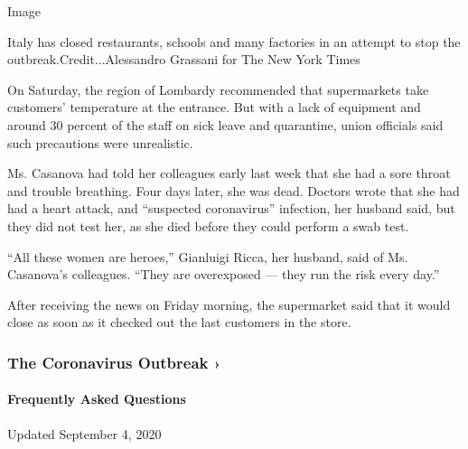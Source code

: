 Image

Italy has closed restaurants, schools and many factories in an attempt
to stop the outbreak.Credit...Alessandro Grassani for The New York Times

On Saturday, the region of Lombardy recommended that supermarkets take
customers' temperature at the entrance. But with a lack of equipment and
around 30 percent of the staff on sick leave and quarantine, union
officials said such precautions were unrealistic.

Ms. Casanova had told her colleagues early last week that she had a sore
throat and trouble breathing. Four days later, she was dead. Doctors
wrote that she had had a heart attack, and ``suspected coronavirus''
infection, her husband said, but they did not test her, as she died
before they could perform a swab test.

``All these women are heroes,'' Gianluigi Ricca, her husband, said of
Ms. Casanova's colleagues. ``They are overexposed --- they run the risk
every day.''

After receiving the news on Friday morning, the supermarket said that it
would close as soon as it checked out the last customers in the store.

\href{https://www.nytimes3xbfgragh.onion/news-event/coronavirus?action=click\&pgtype=Article\&state=default\&region=MAIN_CONTENT_3\&context=storylines_faq}{}

\hypertarget{the-coronavirus-outbreak-}{%
\subsubsection{The Coronavirus Outbreak
›}\label{the-coronavirus-outbreak-}}

\hypertarget{frequently-asked-questions}{%
\paragraph{Frequently Asked
Questions}\label{frequently-asked-questions}}

Updated September 4, 2020

